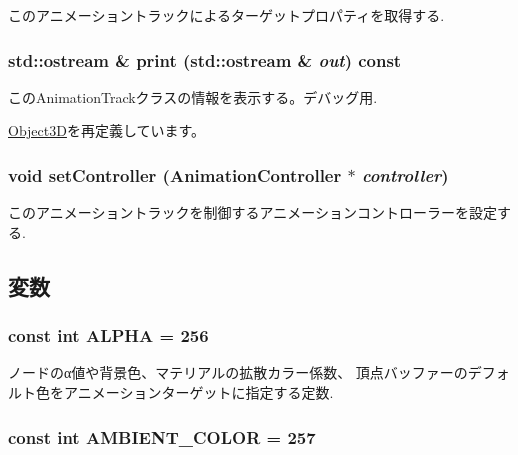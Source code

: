 このアニメーショントラックによるターゲットプロパティを取得する. \hypertarget{classm3g_1_1AnimationTrack_6fea17fa1532df3794f8cb39cb4f911f}{
\subsubsection[{print}]{\setlength{\rightskip}{0pt plus 5cm}std::ostream \& print (std::ostream \& {\em out}) const}}
\label{classm3g_1_1AnimationTrack_6fea17fa1532df3794f8cb39cb4f911f}


このAnimationTrackクラスの情報を表示する。デバッグ用. 

\hyperlink{classm3g_1_1Object3D_6fea17fa1532df3794f8cb39cb4f911f}{Object3D}を再定義しています。\hypertarget{classm3g_1_1AnimationTrack_639279dfdc74095fcb28d0c25aeec6df}{
\subsubsection[{setController}]{\setlength{\rightskip}{0pt plus 5cm}void setController ({\bf AnimationController} $\ast$ {\em controller})}}
\label{classm3g_1_1AnimationTrack_639279dfdc74095fcb28d0c25aeec6df}


このアニメーショントラックを制御するアニメーションコントローラーを設定する. 

\subsection{変数}
\hypertarget{classm3g_1_1AnimationTrack_417581fcde4067111f47320edb2aa378}{
\subsubsection[{ALPHA}]{\setlength{\rightskip}{0pt plus 5cm}const int {\bf ALPHA} = 256}}
\label{classm3g_1_1AnimationTrack_417581fcde4067111f47320edb2aa378}


ノードのα値や背景色、マテリアルの拡散カラー係数、 頂点バッファーのデフォルト色をアニメーションターゲットに指定する定数. \hypertarget{classm3g_1_1AnimationTrack_71b6e9c23b95f8011da4565f4a12f677}{
\subsubsection[{AMBIENT\_\-COLOR}]{\setlength{\rightskip}{0pt plus 5cm}const int {\bf AMBIENT\_\-COLOR} = 257}}
\label{classm3g_1_1AnimationTrack_71b6e9c23b95f8011da4565f4a12f677}


